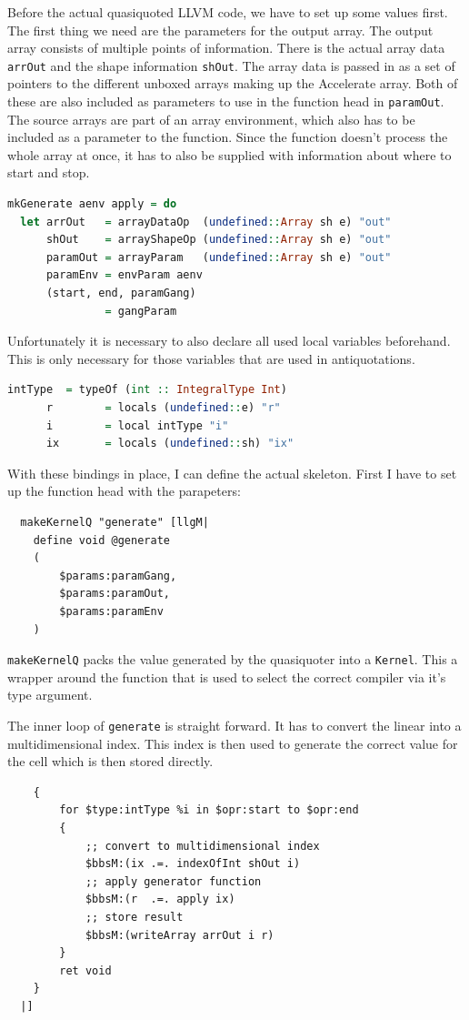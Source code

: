 \documentclass[a4paper,bibliography=totocnumbered,parskip,headsepline]{scrbook}
\begin{document}
Before the actual quasiquoted LLVM code, we have to set up some values first.
The first thing we need are the parameters for the output array.
The output array consists of multiple points of information.
There is the actual array data \lstinline!arrOut! and the shape information \lstinline!shOut!.
The array data is passed in as a set of pointers to the different unboxed arrays making up the Accelerate array.
Both of these are also included as parameters to use in the function head in \lstinline!paramOut!.
The source arrays are part of an array environment, which also has to be included as a parameter to the function.
Since the function doesn't process the whole array at once, it has to also be supplied with information about where to start and stop.
\begin{lstlisting}[language=haskell]
mkGenerate aenv apply = do
  let arrOut   = arrayDataOp  (undefined::Array sh e) "out"
      shOut    = arrayShapeOp (undefined::Array sh e) "out"
      paramOut = arrayParam   (undefined::Array sh e) "out"
      paramEnv = envParam aenv
      (start, end, paramGang)
               = gangParam
\end{lstlisting}
Unfortunately it is necessary to also declare all used local variables beforehand.
This is only necessary for those variables that are used in antiquotations.
\begin{lstlisting}[language=haskell]
      intType  = typeOf (int :: IntegralType Int)
      r        = locals (undefined::e) "r"
      i        = local intType "i"
      ix       = locals (undefined::sh) "ix"
\end{lstlisting}
With these bindings in place, I can define the actual skeleton.
First I have to set up the function head with the parapeters:
\begin{lstlisting}
  makeKernelQ "generate" [llgM|
    define void @generate
    (
        $params:paramGang,
        $params:paramOut,
        $params:paramEnv
    )
\end{lstlisting}
\lstinline!makeKernelQ! packs the value generated by the quasiquoter into a \lstinline!Kernel!.
This a wrapper around the function that is used to select the correct compiler via it's type argument.

The inner loop of \lstinline!generate! is straight forward.
It has to convert the linear into a multidimensional index.
This index is then used to generate the correct value for the cell which is then stored directly.
\begin{lstlisting}
    {
        for $type:intType %i in $opr:start to $opr:end
        {
            ;; convert to multidimensional index
            $bbsM:(ix .=. indexOfInt shOut i)
            ;; apply generator function
            $bbsM:(r  .=. apply ix)
            ;; store result
            $bbsM:(writeArray arrOut i r)
        }
        ret void
    }
  |]
\end{lstlisting}
\end{document}
